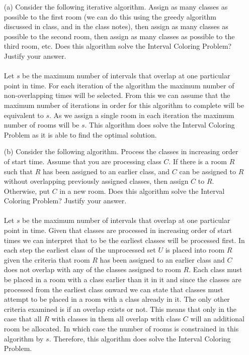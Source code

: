 \documentclass[10pt]{article}
\begin{document}
	\begin{enumerate}
		\item[(a)] Consider the following iterative algorithm. Assign as many classes as possible to the
		first room (we can do this using the greedy algorithm discussed in class, and in the class notes),
		then assign as many classes as possible to the second room, then assign as many classes as possible
		to the third room, etc. Does this algorithm solve the Interval Coloring Problem? Justify your answer.\\
		\\
		Let $s$ be the maximum number of intervals that overlap at one particular point in time. For each iteration
		of the algorithm the maximum number of non-overlapping times will be selected. From this we can assume that
		the maximum number of iterations in order for this algorithm to complete will be equivalent to $s$. As we 
		assign a single room in each iteration the maximum number of rooms will be $s$. This algorithm does solve 
		the Interval Coloring Problem as it is able to find the optimal solution.
		 
		\item[(b)] Consider the following algorithm. Process the classes in increasing order of start time. Assume
		that you are processing class $C$. If there is a room $R$ such that $R$ has been assigned to an earlier
		class, and $C$ can be assigned to $R$ without overlapping previously assigned classes, then assign $C$ to
		$R$. Otherwise, put $C$ in a new room. Does this algorithm solve the Interval Coloring Problem? Justify your answer.\\
		\\
		Let $s$ be the maximum number of intervals that overlap at one particular point in time. Given that classes
		are processed in increasing order of start times we can interpret that to be the earliest classes will be
		processed first. In each step the earliest class of the unprocessed set $U$ is placed into room $R$ given
		the criteria that room $R$ has been assigned to an earlier class and $C$ does not overlap with any of the 
		classes assigned to room $R$. Each class must be placed in a room with a class earlier than it in it and 
		since the classes are processed from the earliest class onward we can state that classes must attempt to
		be placed in a room with a class already in it. The only other criteria examined is if an overlap exists
		or not. This means that only in the case that all $R$ with classes in them all overlap with class $C$ will
		an additional room be allocated. In which case the number of rooms is constrained in this algorithm by $s$.
		Therefore, this algorithm does solve the Interval Coloring Problem.
	\end{enumerate}
\end{document}
